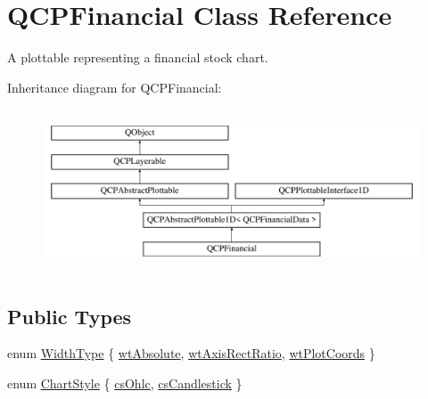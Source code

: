 \hypertarget{class_q_c_p_financial}{}\section{Q\+C\+P\+Financial Class Reference}
\label{class_q_c_p_financial}


A plottable representing a financial stock chart.  


Inheritance diagram for Q\+C\+P\+Financial\+:\begin{figure}[H]
\begin{center}
\leavevmode
\includegraphics[height=4.878048cm]{class_q_c_p_financial}
\end{center}
\end{figure}
\subsection*{Public Types}
\begin{DoxyCompactItemize}
\item 
enum \mbox{\hyperlink{class_q_c_p_financial_aef1761dda71a53dc5269685e9e492626}{Width\+Type}} \{ \mbox{\hyperlink{class_q_c_p_financial_aef1761dda71a53dc5269685e9e492626a0758d53bb6d7b4858e6bf8771edc934a}{wt\+Absolute}}, 
\mbox{\hyperlink{class_q_c_p_financial_aef1761dda71a53dc5269685e9e492626a806518350ea5814d28c29b0056e33ecd}{wt\+Axis\+Rect\+Ratio}}, 
\mbox{\hyperlink{class_q_c_p_financial_aef1761dda71a53dc5269685e9e492626af676bc8dbe700b96b333329c9dbfc30f}{wt\+Plot\+Coords}}
 \}
\item 
enum \mbox{\hyperlink{class_q_c_p_financial_a0f800e21ee98d646dfc6f8f89d10ebfb}{Chart\+Style}} \{ \mbox{\hyperlink{class_q_c_p_financial_a0f800e21ee98d646dfc6f8f89d10ebfba3a516016c9298d3e95dd82aa203c4390}{cs\+Ohlc}}, 
\mbox{\hyperlink{class_q_c_p_financial_a0f800e21ee98d646dfc6f8f89d10ebfbac803cbd39f26e3f206bcc7028679e62f}{cs\+Candlestick}}
 \}
\end{DoxyCompactItemize}
